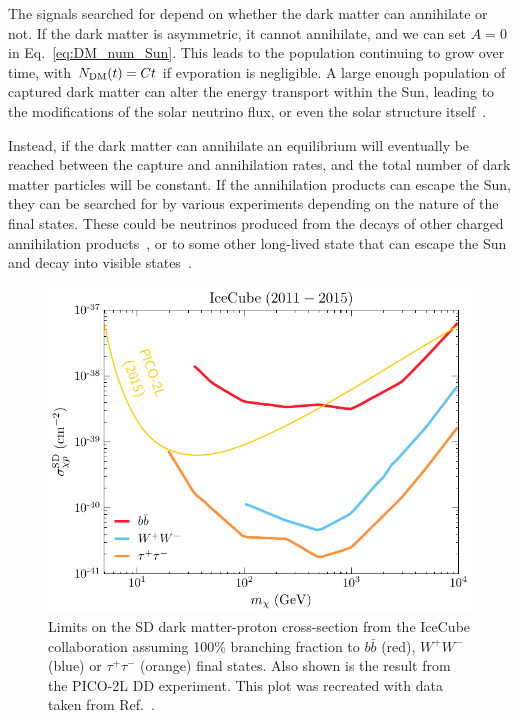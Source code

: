 The signals searched for depend on whether the dark matter can annihilate or not. If the dark matter is asymmetric, it cannot annihilate, and we can set $A = 0$ in Eq.~\ref{eq:DM_num_Sun}. This leads to the population continuing to grow over time, with $N_\mathrm{DM}(t) = Ct$ if evporation is negligible. A large enough population of captured dark matter can alter the energy transport within the Sun, leading to the modifications of the solar neutrino flux, or even the solar structure itself~\cite{Franarin:2018gfk_jun_JUNOSensitivityResonant, Cumberbatch:2010hh_LightWIMPsSun, Vincent:2013lua_apr_Thermalconductiondark,Vincent:2015gqa_aug_Generalisedformfactor}. 

Instead, if the dark matter can annihilate an equilibrium will eventually be reached between the capture and annihilation rates, and the total number of dark matter particles will be constant. If the annihilation products can escape the Sun, they can be searched for by various experiments depending on the nature of the final states.
These could be neutrinos produced from the decays of other charged annihilation products~\cite{Super-Kamiokande:2011wjy_IndirectSearchWIMPs,Super-Kamiokande:2015xms_apr_Searchneutrinosannihilation,ANTARES:2016obx_may_SearchSecludedDark,ANTARES:2016xuh_aug_LimitsDarkMatter,IceCube:2016dgk_Searchannihilatingdark}, or to some other long-lived state that can escape the Sun and decay into visible states~\cite{Batell:2009zp_SolarGammaRays,Schuster:2009au_TerrestrialSolarLimits,Bell:2011sn_Enhancedneutrinosignals,Feng:2016ijc_jun_DarkSunshineDetecting,Leane:2017vag_jun_PowerfulSolarSignatures}.


\begin{figure}[!t]
    \centering
    \includegraphics{IceCube_2016.pdf}
    \caption{Limits on the SD dark matter-proton cross-section from the IceCube collaboration assuming 100\% branching fraction to $b\bar{b}$ (red), $W^+ W^-$ (blue) or $\tau^+ \tau^-$ (orange) final states. Also shown is the result from the PICO-2L DD experiment. This plot was recreated with data taken from Ref.~\cite{IceCube:2016dgk_mar_Searchannihilatingdark}.}
    \label{fig:IceCube_2016_SD}
\end{figure}

